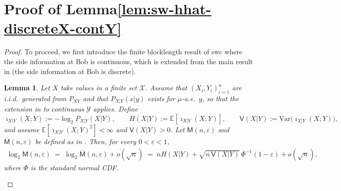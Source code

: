 \documentclass[onecolumn]{IEEEtran} %
\newcommand{\1}{\mathbbm{1}}
\theoremstyle{boldremark}
\newtheorem{lemma}{Lemma}
\begin{document}
\section{Proof of Lemma\ref{lem:sw-hhat-discreteX-contY}}\label{APP_proof_sw-hhat-discreteX-contY}
\begin{proof}
To proceed, we first introduce the finite blocklength result of \gls{swc} where the side information at Bob is continuous, which is extended from the main result in \cite{Hayashi_SWC_Entropy20} (the side information at Bob is discrete).

\begin{lemma}\label{lem:sw_continuous_SI_second_order}
Let $X$ take values in a finite set $\mathcal{X}$.  Assume that $(X_i,Y_i)_{i=1}^n$ are i.i.d.\ generated from $P_{XY}$ and that
$P_{X|Y}(x|y)$ exists for $\mu$-a.e.\ $y$, so that the extension in \cite[Remark~1]{Hayashi_SWC_Entropy20} to continuous $\mathcal{Y}$ applies. Define
\[
  \imath_{X|Y}(X;Y) := -\log_2 P_{X|Y}(X|Y),\qquad
  H(X|Y) := \mathbb{E}[\imath_{X|Y}(X;Y)],\qquad
  \textsf{V}(X|Y) := \mathrm{Var}\!\bigl(\imath_{X|Y}(X;Y)\bigr),
\]
and assume $\mathbb{E}[\imath_{X|Y}(X;Y)^2]<\infty$ and $\textsf{V}(X|Y)>0$.
Let $\textsf{M}(n,\varepsilon)$ and $\overline{\textsf{M}}(n,\varepsilon)$ be defined as in \cite[Sec.~3.1]{Hayashi_SWC_Entropy20}.
Then, for every $0<\varepsilon<1$,
\begin{align}
  \log_2 \textsf{M}(n,\varepsilon)
  \;=\;
  \log_2 \overline{\textsf{M}}(n,\varepsilon) + o(\sqrt{n})
  \;=\;
  n H(X|Y) + \sqrt{n\,\textsf{V}(X|Y)}\,\Phi^{-1}(1-\varepsilon) + o(\sqrt{n}),
  \label{eq:sw_second_order_continuousY}
\end{align}
where $\Phi$ is the standard normal CDF.
\end{lemma}


\end{proof}
\end{document}
